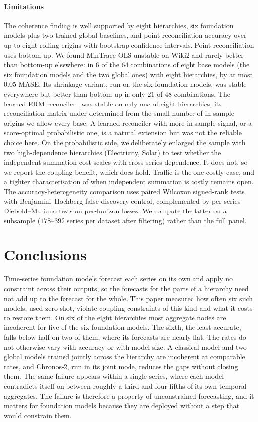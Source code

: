 \documentclass[review,number]{elsarticle}
\begin{document}
\paragraph{Limitations} The coherence finding is well supported by eight hierarchies,
six foundation models plus two trained global baselines, and point-reconciliation
accuracy over up to eight rolling origins with bootstrap confidence intervals. Point
reconciliation uses bottom-up. We found MinTrace-OLS unstable on Wiki2 and rarely better
than bottom-up elsewhere: in $6$ of the $64$ combinations of eight base models (the six
foundation models and the two global ones) with eight hierarchies, by at most $0.05$
MASE. Its shrinkage variant, run on the six foundation models, was stable everywhere but
better than bottom-up in only $21$ of $48$ combinations. The learned ERM
reconciler~\citep{bentaieb2019erm} was stable on only one of eight hierarchies, its
reconciliation matrix under-determined from the small number of in-sample origins we
allow every base. A learned
reconciler with more in-sample signal, or a score-optimal probabilistic one, is a natural
extension but was not the reliable choice here. On the probabilistic side, we deliberately
enlarged the sample with two high-dependence hierarchies (Electricity, Solar) to test
whether the independent-summation cost scales with cross-series dependence. It does not,
so we report the coupling benefit, which does hold. Traffic is
the one costly case, and a tighter characterisation of when independent summation is
costly remains open.
The accuracy-heterogeneity comparison uses paired
Wilcoxon signed-rank tests with Benjamini--Hochberg false-discovery control,
complemented by per-series Diebold--Mariano tests on per-horizon losses. We compute the
latter on a subsample ($178$--$392$ series per dataset after filtering) rather than the
full panel.

\section{Conclusions}
\label{sec:conclusions}
Time-series foundation models forecast each series on its own and apply no constraint
across their outputs, so the forecasts for the parts of a hierarchy need not add up to
the forecast for the whole. This paper measured how often six such models, used
zero-shot, violate coupling constraints of this kind and what it costs to restore them. On six of the eight hierarchies most aggregate nodes are
incoherent for five of the six foundation models. The sixth, the least accurate, falls
below half on two of them, where its forecasts are nearly flat. The rates do not
otherwise vary with accuracy or with model size. A classical model and two global models trained jointly
across the hierarchy are incoherent at comparable rates, and Chronos-2, run in its joint
mode, reduces the gaps without closing them. The same failure appears within a single
series, where each model contradicts itself on between roughly a third and four fifths
of its own temporal aggregates. The failure is therefore a property of unconstrained
forecasting, and it matters for foundation models because they are deployed without a
step that would constrain them.
\end{document}
